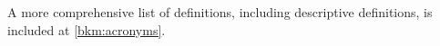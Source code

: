 A more comprehensive list of definitions, including descriptive definitions, is included at \autoref{bkm:acronyms}.
